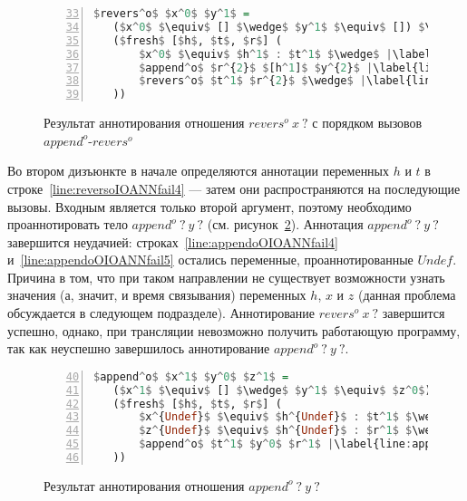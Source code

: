 \begin{figure}[h!]
  \begin{center}
  \begin{minipage}{0.5\textwidth}
  \begin{lstlisting}[language=Haskell, frame=single, numbers=left,numberstyle=\small, firstnumber=33, escapechar=|]
 $revers^o$ $x^0$ $y^1$ =
   ($x^0$ $\equiv$ [] $\wedge$ $y^1$ $\equiv$ []) $\vee$ |\label{line:reversoIOANNfail2}|
   ($fresh$ [$h$, $t$, $r$] (
       $x^0$ $\equiv$ $h^1$ : $t^1$ $\wedge$ |\label{line:reversoIOANNfail4}|
       $append^o$ $r^{2}$ $[h^1]$ $y^{2}$ |\label{line:reversoIOANNfail5}|
       $revers^o$ $t^1$ $r^{2}$ $\wedge$ |\label{line:reversoIOANNfail6}|
   ))
    \end{lstlisting}
  \end{minipage}
  \end{center}
  \caption{Результат аннотирования отношения $revers^o \ x \ ?$ с порядком вызовов $append^o$-$revers^o$}
  \label{lst:reversoIOANNfail}
\end{figure}

Во втором дизъюнкте в начале определяются аннотации переменных $h$ и $t$ в строке~\ref{line:reversoIOANNfail4} --- затем они распространяются на последующие вызовы.
Входным является только второй аргумент, поэтому необходимо проаннотировать тело $append^o \ ? \ y \ ?$ (см. рисунок~\ref{lst:appendoOIOANNfail}).
Аннотация $append^o \ ? \ y \ ?$ завершится неудачией: строках~\ref{line:appendoOIOANNfail4} и~\ref{line:appendoOIOANNfail5} остались переменные, проаннотированные $Undef$.
Причина в том, что при таком направлении не существует возможности узнать значения (а, значит, и время связывания) переменных $h$, $x$ и $z$ (данная проблема обсуждается в следующем подразделе).
Аннотирование $revers^o \ x \ ?$ завершится успешно, однако, при трансляции невозможно получить работающую программу, так как неуспешно завершилось аннотирование $append^o \ ? \ y \ ?$.

\begin{figure}[h!]
  \begin{center}
  \begin{minipage}{0.55\textwidth}
  \begin{lstlisting}[language=Haskell, frame=single, numbers=left,numberstyle=\small, firstnumber=40, escapechar=|]
 $append^o$ $x^1$ $y^0$ $z^1$ =
   ($x^1$ $\equiv$ [] $\wedge$ $y^1$ $\equiv$ $z^0$) $\vee$ |\label{line:appendoOIOANNfail2}|
   ($fresh$ [$h$, $t$, $r$] (
       $x^{Undef}$ $\equiv$ $h^{Undef}$ : $t^1$ $\wedge$ |\label{line:appendoOIOANNfail4}|
       $z^{Undef}$ $\equiv$ $h^{Undef}$ : $r^1$ $\wedge$ |\label{line:appendoOIOANNfail5}|
       $append^o$ $t^1$ $y^0$ $r^1$ |\label{line:appendoOIOANNfail6}|
   ))
    \end{lstlisting}
  \end{minipage}
  \end{center}
  \caption{Результат аннотирования отношения $append^o \ ? \ y \ ?$}
  \label{lst:appendoOIOANNfail}
\end{figure}


